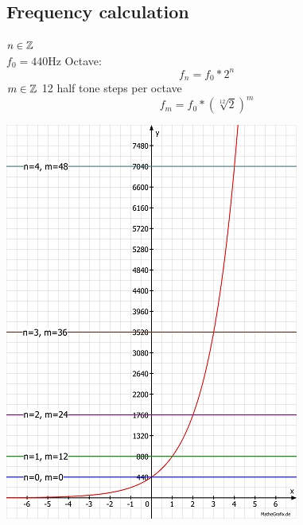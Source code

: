 \subsection{Frequency calculation}
	$ n\in\mathbb{Z} $\\
	$ f_0=440 $Hz
	Octave:
	\begin{equation*}
		f_n=f_0*2^n
	\end{equation*}
		$ m\in\mathbb{Z} $
		12 half tone steps per octave
	\begin{equation}
		f_m=f_0*(\sqrt[12]{2})^m
	\end{equation}
	\begin{center}
		\includegraphics[scale=0.1]{img/frequencyFunction.jpg}
	\end{center}